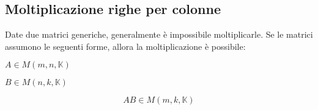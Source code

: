 \documentclass{subfiles}
\begin{document}
\subsection{Moltiplicazione righe per colonne}

Date due matrici generiche, generalmente è impossibile moltiplicarle.
Se le matrici assumono le seguenti forme, allora la moltiplicazione è possibile:

\begin{description}
	\item $A \in M(m,n,\mathbb{K})$
	\item $B \in M(n,k,\mathbb{K})$
\end{description}

$$
AB \in M(m,k,\mathbb{K})
$$
\end{document}
